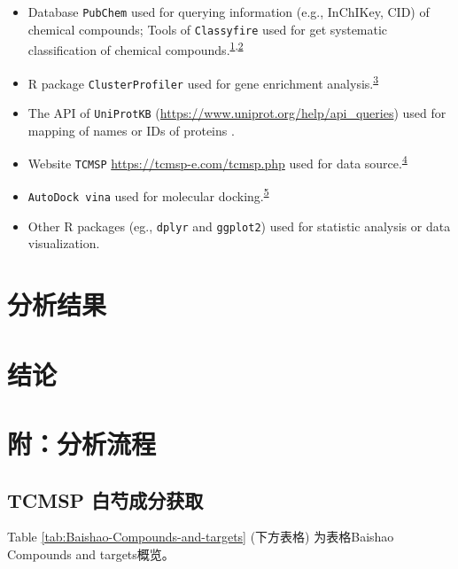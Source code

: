 \documentclass[
]{article}
\providecommand{\tightlist}{%
  \setlength{\itemsep}{0pt}\setlength{\parskip}{0pt}}
\begin{document}
\begin{itemize}
\tightlist
\item
  Database \texttt{PubChem} used for querying information (e.g., InChIKey, CID) of chemical compounds; Tools of \texttt{Classyfire} used for get systematic classification of chemical compounds.\textsuperscript{\protect\hyperlink{ref-PubchemSubstanKimS2015}{1},\protect\hyperlink{ref-ClassyfireAutDjoumb2016}{2}}
\item
  R package \texttt{ClusterProfiler} used for gene enrichment analysis.\textsuperscript{\protect\hyperlink{ref-ClusterprofilerWuTi2021}{3}}
\item
  The API of \texttt{UniProtKB} (\url{https://www.uniprot.org/help/api_queries}) used for mapping of names or IDs of proteins .
\item
  Website \texttt{TCMSP} \url{https://tcmsp-e.com/tcmsp.php} used for data source.\textsuperscript{\protect\hyperlink{ref-TcmspADatabaRuJi2014}{4}}
\item
  \texttt{AutoDock\ vina} used for molecular docking.\textsuperscript{\protect\hyperlink{ref-AutodockVina1Eberha2021}{5}}
\item
  Other R packages (eg., \texttt{dplyr} and \texttt{ggplot2}) used for statistic analysis or data visualization.
\end{itemize}

\hypertarget{results}{%
\section{分析结果}\label{results}}

\hypertarget{dis}{%
\section{结论}\label{dis}}

\hypertarget{workflow}{%
\section{附：分析流程}\label{workflow}}

\hypertarget{tcmsp-ux767dux828dux6210ux5206ux83b7ux53d6}{%
\subsection{TCMSP 白芍成分获取}\label{tcmsp-ux767dux828dux6210ux5206ux83b7ux53d6}}

Table \ref{tab:Baishao-Compounds-and-targets} (下方表格) 为表格Baishao Compounds and targets概览。
\end{document}
